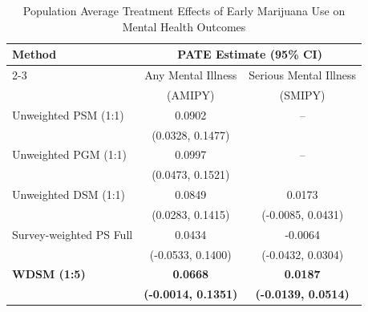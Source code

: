\begin{table}[htbp]
\centering
\caption{Population Average Treatment Effects of Early Marijuana Use on Mental Health Outcomes}
\begin{tabular}{|l|c|c|}
\hline
Method & \multicolumn{2}{c|}{PATE Estimate (95\% CI)} \\
\cline{2-3}
& Any Mental Illness & Serious Mental Illness \\
& (AMIPY) & (SMIPY) \\
\hline
Unweighted PSM (1:1) & 0.0902 & -- \\
& (0.0328, 0.1477) & \\
\hline
Unweighted PGM (1:1) & 0.0997 & -- \\
& (0.0473, 0.1521) & \\
\hline
Unweighted DSM (1:1) & 0.0849 & 0.0173 \\
& (0.0283, 0.1415) & (-0.0085, 0.0431) \\
\hline
Survey-weighted PS Full & 0.0434 & -0.0064 \\
& (-0.0533, 0.1400) & (-0.0432, 0.0304) \\
\hline
\textbf{WDSM (1:5)} & \textbf{0.0668} & \textbf{0.0187} \\
& \textbf{(-0.0014, 0.1351)} & \textbf{(-0.0139, 0.0514)} \\
\hline
\end{tabular}
\label{tab:marijuana_results}
\end{table}
